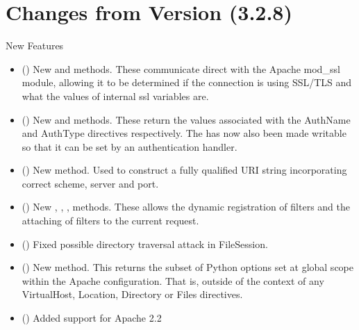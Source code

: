 \chapter{Changes from Version (3.2.8)\label{app-changes-from-3.2.8}}

  
  New Features

  \begin{itemize}
    \item
      ()
      New  and  methods.
      These communicate direct with the Apache mod_ssl module, allowing
      it to be determined if the connection is using SSL/TLS and what the
      values of internal ssl variables are.
    \item
      ()
      New  and  methods.
      These return the values associated with the AuthName and AuthType
      directives respectively. The  has now also
      been made writable so that it can be set by an authentication
      handler.
    \item
      ()
      New  method. Used to construct a fully
      qualified URI string incorporating correct scheme, server and port.
    \item
      ()
      New , ,
      , 
      methods. These allows the dynamic registration of filters and the
      attaching of filters to the current request.
    \item
      ()
      Fixed possible directory traversal attack in FileSession.
    \item
      ()
      New  method. This returns the subset
      of Python options set at global scope within the Apache configuration.
      That is, outside of the context of any VirtualHost, Location, Directory
      or Files directives.
    \item
      ()
      Added support for Apache 2.2
  \end{itemize}

